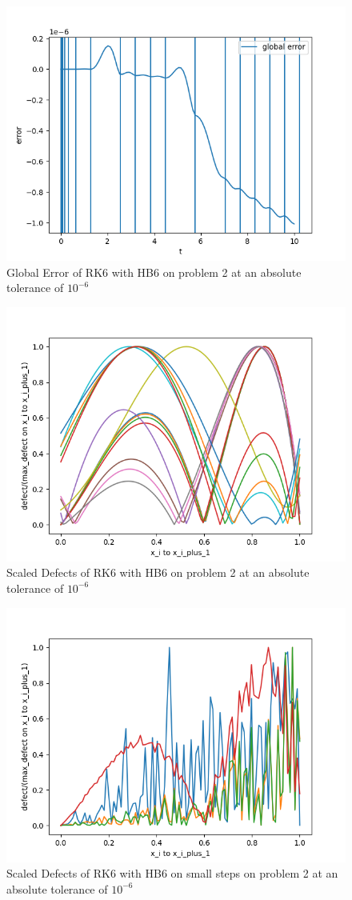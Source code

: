 \documentclass{article}
\begin{document}
\begin{figure}[H]
\centering
\includegraphics[width=0.7\linewidth]{./figures/rk6_with_hb6_p2_global_error}
\caption{Global Error of RK6 with HB6 on problem 2 at an absolute tolerance of $10^{-6}$}
\label{fig:rk6_with_hb6_p2_global_error}
\end{figure}

\begin{figure}[H]
\centering
\includegraphics[width=0.7\linewidth]{./figures/rk6_with_hb6_p2_scaled_defects}
\caption{Scaled Defects of RK6 with HB6 on problem 2 at an absolute tolerance of $10^{-6}$}
\label{fig:rk6_with_hb6_p2_scaled_defects}
\end{figure}

\begin{figure}[H]
\centering
\includegraphics[width=0.7\linewidth]{./figures/rk6_with_hb6_p2_scaled_defects_small_steps}
\caption{Scaled Defects of RK6 with HB6 on small steps on problem 2 at an absolute tolerance of $10^{-6}$}
\label{fig:rk6_with_hb6_p2_scaled_defects_small_steps}
\end{figure}
\end{document}
